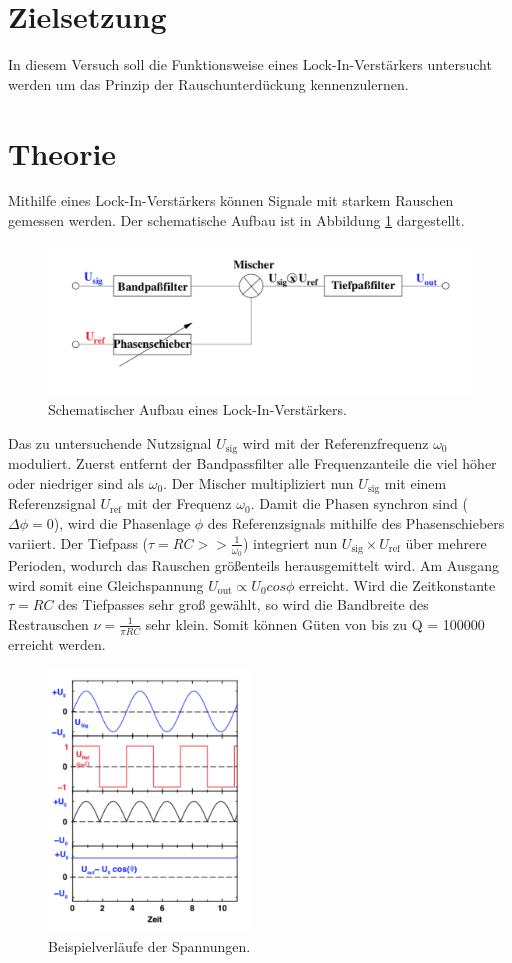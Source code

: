 \section{Zielsetzung}

In diesem Versuch soll die Funktionsweise eines Lock-In-Verstärkers untersucht werden um das Prinzip der Rauschunterdückung kennenzulernen.

\section{Theorie}

Mithilfe eines Lock-In-Verstärkers können Signale mit starkem Rauschen gemessen werden. 
Der schematische Aufbau ist in Abbildung \ref{fig:Aufbau} dargestellt.
\begin{figure}[h]
  \centering
  \includegraphics[height=4cm]{Grafiken/Schaltung.pdf}
  \caption{Schematischer Aufbau eines Lock-In-Verstärkers. \cite{1}}
  \label{fig:Aufbau}
\end{figure}
Das zu untersuchende Nutzsignal $U_\text{sig}$ wird mit der Referenzfrequenz $\omega_0$ moduliert.  Zuerst entfernt der Bandpassfilter alle Frequenzanteile die viel höher oder niedriger sind als $\omega_0$. Der Mischer multipliziert nun $U_\text{sig}$ mit einem Referenzsignal $U_\text{ref}$ mit der Frequenz $\omega_0$. Damit die Phasen synchron sind ($\Delta \phi = 0$), wird die Phasenlage $\phi$ des Referenzsignals mithilfe des Phasenschiebers variiert.
Der Tiefpass ($\tau = RC >> \frac{1}{\omega_0}$) integriert nun $U_\text{sig} \times U_\text{ref}$  über mehrere Perioden, wodurch das Rauschen größenteils herausgemittelt wird. Am Ausgang wird somit eine Gleichspannung $U_\text{out} \propto U_0 cos\phi$ erreicht. 
Wird die Zeitkonstante $\tau = RC$ des Tiefpasses sehr groß gewählt, so wird die Bandbreite des Restrauschen $\nu = \frac{1}{\pi RC}$ sehr klein. Somit können Güten von bis zu Q = 100000 erreicht werden.
\\
\begin{figure}[h]
  \centering
  \includegraphics[height=7cm]{Grafiken/Spannung.pdf}
  \caption{Beispielverläufe der Spannungen. \cite{1}}
  \label{fig:Spannung}
\end{figure}

